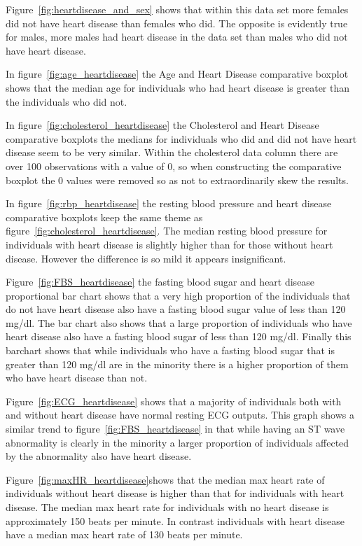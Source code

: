 \documentclass[12pt]{article}
\begin{document}
Figure~\ref*{fig:heartdisease_and_sex} shows that within this data set more females did not have heart disease than females who did. The opposite is evidently true for males, more males had heart disease in the data set than males who did not have heart disease. 

In figure~\ref*{fig:age_heartdisease} the Age and Heart Disease comparative boxplot shows that the median age for individuals who had heart disease is greater than the individuals who did not. 

In figure~\ref*{fig:cholesterol_heartdisease} the Cholesterol and Heart Disease comparative boxplots the medians for individuals who did and did not have heart disease seem to be very similar. Within the cholesterol data column there are over 100 observations with a value of 0, so when constructing the comparative boxplot the 0 values were removed so as not to extraordinarily skew the results.  

In figure~\ref*{fig:rbp_heartdisease} the resting blood pressure and heart disease comparative boxplots keep the same theme as figure~\ref*{fig:cholesterol_heartdisease}. The median resting blood pressure for individuals with heart disease is slightly higher than for those without heart disease. However the difference is so mild it appears insignificant. 

Figure~\ref*{fig:FBS_heartdisease} the fasting blood sugar and heart disease proportional bar chart shows that a very high proportion of the individuals that do not have heart disease also have a fasting blood sugar value of less than 120 mg/dl. The bar chart also shows that a large proportion of individuals who have heart disease also have a fasting blood sugar of less than 120 mg/dl. Finally this barchart shows that while individuals who have a fasting blood sugar that is greater than 120 mg/dl are in the minority there is a higher proportion of them who have heart disease than not. 

Figure~\ref*{fig:ECG_heartdisease} shows that a majority of individuals both with and without heart disease have normal resting ECG outputs. This graph shows a similar trend to figure~\ref*{fig:FBS_heartdisease} in that while having an ST wave abnormality is clearly in the minority a larger proportion of individuals affected by the abnormality also have heart disease.

Figure~\ref*{fig:maxHR_heartdisease}shows that the median max heart rate of individuals without heart disease is higher than that for individuals with heart disease. The median max heart rate for individuals with no heart disease is approximately 150 beats per minute. In contrast individuals with heart disease have a median max heart rate of 130 beats per minute.  
\end{document}
